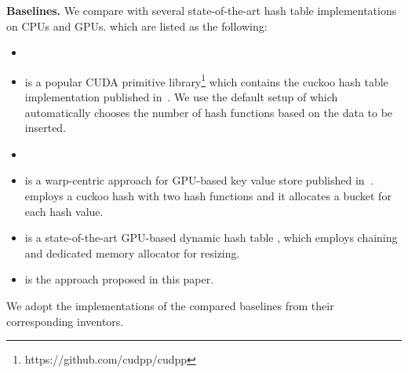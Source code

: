 \vspace{1mm}\noindent\textbf{Baselines.} We compare \voter with several state-of-the-art hash table implementations on CPUs and GPUs. which are listed as the following:
\begin{itemize}
	\item {}
	\item \cudpp is a popular CUDA primitive library\footnote{https://github.com/cudpp/cudpp} which contains the cuckoo hash table implementation published in~\cite{alcantara2009real}.  
	We use the default setup of \cudpp which automatically chooses the number of hash functions based on the data to be inserted.
	\item {}
	\item \megakv is a warp-centric approach for GPU-based key value store published in~\cite{zhang2015mega}. \megakv employs a cuckoo hash with two hash functions and
	it allocates a bucket for each hash value. 
	\item \slab is a state-of-the-art GPU-based dynamic hash table \cite{ashkiani2018dynamic}, which employs chaining and dedicated memory allocator for resizing.
	\item \voter is the approach proposed in this paper. 
\end{itemize}
We adopt the implementations of the compared baselines from their corresponding inventors.

